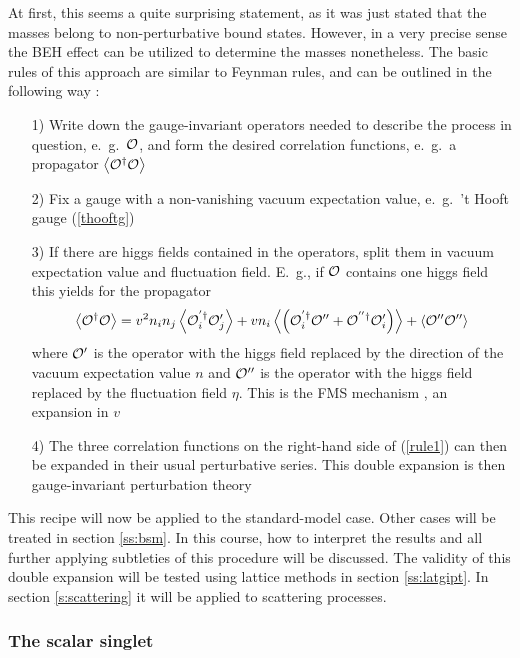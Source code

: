 \documentclass[final,12pt]{article}
\newcommand*{\no}{\noindent}
\newcommand*{\be}{\begin{equation}}
\newcommand*{\ee}{\end{equation}}
\newcommand*{\pref}[1]{(\ref{#1})}
\newcommand*{\1}{1\!\!\!\bot}
\newcommand*{\la}{\left\langle}
\newcommand*{\ra}{\right\rangle}
\newcommand*{\op}{{\cal O}}
\begin{document}
At first, this seems a quite surprising statement, as it was just stated that the masses belong to non-perturbative bound states. However, in a very precise sense \cite{Frohlich:1980gj,Frohlich:1981yi} the BEH effect can be utilized to determine the masses nonetheless. The basic rules of this approach are similar to Feynman rules, and can be outlined in the following way \cite{Maas:2012ct,Egger:2017tkd,Torek:2016ede}:
\begin{itemize}
 \item[1)] Write down the gauge-invariant operators needed to describe the process in question, e.\ g.\ $\op$, and form the desired correlation functions, e.\ g.\ a propagator $\la\op^\dagger\op\ra$
 \item[2)] Fix a gauge with a non-vanishing vacuum expectation value, e.\ g.\ 't Hooft gauge \pref{thooftg}
 \item[3)] If there are higgs fields contained in the operators, split them in vacuum expectation value and fluctuation field. E.\ g., if $\op$ contains one higgs field this yields for the propagator
 \be
 \la\op^\dagger\op\ra=v^2n_in_j\la\op_i^{'\dagger}\op_j'\ra+vn_i\la\left(\op_i^{'\dagger}\op''+\op^{''\dagger}\op_i'\right)\ra+\la\op''\op''\ra\label{rule1}
 \ee
 \no where $\op'$ is the operator with the higgs field replaced by the direction of the vacuum expectation value $n$ and $\op''$ is the operator with the higgs field replaced by the fluctuation field $\eta$. This is the FMS mechanism \cite{Frohlich:1980gj,Frohlich:1981yi}, an expansion in $v$
 \item[4)] The three correlation functions on the right-hand side of \pref{rule1} can then be expanded in their usual perturbative series. This double expansion is then gauge-invariant perturbation theory
\end{itemize}
This recipe will now be applied to the standard-model case. Other cases will be treated in section \ref{ss:bsm}. In this course, how to interpret the results and all further applying subtleties of this procedure will be discussed. The validity of this double expansion will be tested using lattice methods in section \ref{ss:latgipt}. In section \ref{s:scattering} it will be applied to scattering processes.

\subsubsection{The scalar singlet}\label{sss:ss}
\end{document}
